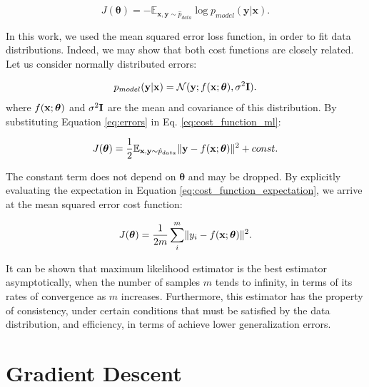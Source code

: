 \begin{equation}
J(\boldsymbol{\theta}) = -\mathbb{E}_{\mathrm{\mathbf{x}},\mathrm{\mathbf{y}}\sim \hat{p}_{data}}\log{p_{model}(\mathrm{\mathbf{y}} | \mathrm{\mathbf{x}})}.
\label{eq:cost_function_ml}
\end{equation}

In this work, we used the mean squared error loss function, in order to fit data distributions. Indeed, we may show that both cost functions are closely related. Let us consider normally distributed errors:

\begin{equation}
{p_{model}(\bvec{y} | \bvec{x})} = \mathcal{N}( \bvec{y}; f (\bvec{x}; \boldsymbol{\theta}), \sigma^{2}\bvec{I}).
\label{eq:errors}
\end{equation}
where \(f (\mathrm{\mathbf{x}}; \boldsymbol{\theta})\) and \(\sigma^{2}\mathrm{\mathbf{I}}\)  are the mean and covariance of this distribution. By substituting Equation \eqref{eq:errors} in Eq. \eqref{eq:cost_function_ml}:

\begin{equation}
J(\boldsymbol{\theta}) = \frac{1}{2}\mathbb{E}_{\bvec{x},\bvec{y}\sim \hat{p}_{data}} \lVert \bvec{y} - f (\bvec{x}; \boldsymbol{\theta}) \rVert ^{2} + const.
\label{eq:cost_function_expectation}
\end{equation} 

The constant term does not depend on \( \boldsymbol{\theta} \) and may be dropped. By explicitly evaluating the expectation in Equation \eqref{eq:cost_function_expectation}, we arrive at the mean squared error cost function:

\begin{equation}
J(\boldsymbol{\theta}) = \frac{1}{2m} \sum^{m}_{i} \lVert y_{i} - f (\mathrm{\mathbf{x}}; \boldsymbol{\theta}) \rVert ^{2}.
\end{equation}

It can be shown that maximum likelihood estimator is the best estimator asymptotically, when the number of samples $m$ tends to infinity, in terms of its rates of convergence as $m$ increases. Furthermore, this estimator has the property of consistency, under certain conditions that must be satisfied by the data distribution, and efficiency, in terms of achieve lower generalization errors.	

\section{Gradient Descent}\label{gradientdescent}

